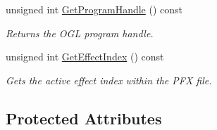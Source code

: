 \begin{DoxyCompactItemize}
unsigned int \hyperlink{class_c_p_v_r_t_p_f_x_effect_a69ced662214587ef4bef6d7d24a5f4d5}{Get\+Program\+Handle} () const 
\begin{DoxyCompactList}\small\item\em Returns the O\+G\+L program handle. \end{DoxyCompactList}\item 
unsigned int \hyperlink{class_c_p_v_r_t_p_f_x_effect_a988a10ab800423f363b7fb8a140dbc39}{Get\+Effect\+Index} () const 
\begin{DoxyCompactList}\small\item\em Gets the active effect index within the P\+F\+X file. \end{DoxyCompactList}\end{DoxyCompactItemize}
\subsection*{Protected Attributes}
